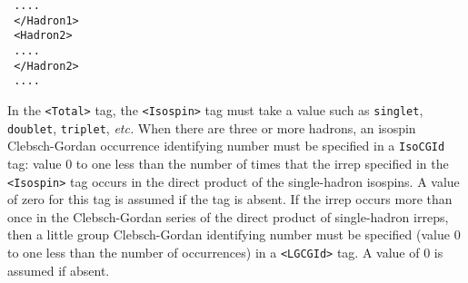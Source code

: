 \documentclass[12pt,notitlepage,letterpaper]{article}
\newcommand{\vb}{\texttt}
\begin{document}
\begin{itemize}
\hspace*{15pt}\texttt{      ....    }\\                                                  
\texttt{   </Hadron1>}\\                                                   
\texttt{   <Hadron2> }\\                                                   
\hspace*{15pt}\texttt{      ....   }\\                                                   
\texttt{   </Hadron2> }\\                                                  
\texttt{   ....     }
\end{itemize}                                                   
In the \vb{<Total>} tag, the \vb{<Isospin>} tag must take a value such  
as \vb{singlet}, \vb{doublet}, \vb{triplet}, \textit{etc.}  When there are      
three or more hadrons, an isospin Clebsch-Gordan occurrence   
identifying number must be specified in a \vb{IsoCGId} tag: value 0 to    
one less than the number of times that the irrep specified in the 
\vb{<Isospin>}
tag occurs in      
the direct product of the single-hadron isospins.  A value    
of zero for this tag is assumed if the tag is absent.         
If the irrep occurs more than once in the Clebsch-Gordan      
series of the direct product of single-hadron irreps, then    
a little group Clebsch-Gordan identifying number      
must be specified (value 0 to one less than the number of     
occurrences) in a \vb{<LGCGId>} tag.  A value of 0 is assumed if absent.             
                                                              
\end{document}
